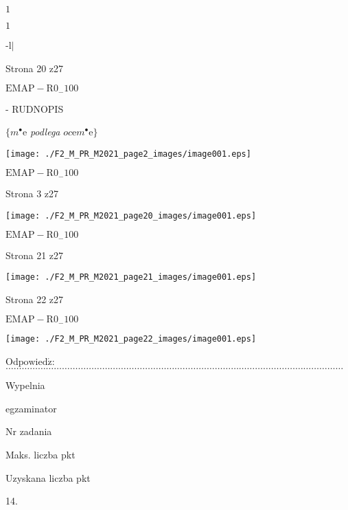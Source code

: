 \documentclass[a4paper,12pt]{article}
\begin{document}
$1$

$1$

-l$|$

Strona 20 z27

$\mathrm{E}\mathrm{M}\mathrm{A}\mathrm{P}-\mathrm{R}0_{-}100$





- RUDNOPIS

$\{m^{\bullet}\mathrm{e}$ {\it podlega} $oc\mathrm{e}m^{\bullet}\mathrm{e}\}$
\begin{center}
\texttt{[image: ./F2\_M\_PR\_M2021\_page2\_images/image001.eps]}
\end{center}
$\mathrm{E}\mathrm{M}\mathrm{A}\mathrm{P}-\mathrm{R}0_{-}100$

Strona 3 z27




\begin{center}
\texttt{[image: ./F2\_M\_PR\_M2021\_page20\_images/image001.eps]}
\end{center}
$\mathrm{E}\mathrm{M}\mathrm{A}\mathrm{P}-\mathrm{R}0_{-}100$

Strona 21 z27




\begin{center}
\texttt{[image: ./F2\_M\_PR\_M2021\_page21\_images/image001.eps]}
\end{center}
Strona 22 z27

$\mathrm{E}\mathrm{M}\mathrm{A}\mathrm{P}-\mathrm{R}0_{-}100$




\begin{center}
\texttt{[image: ./F2\_M\_PR\_M2021\_page22\_images/image001.eps]}
\end{center}
$\mathrm{O}\mathrm{d}\mathrm{p}\mathrm{o}\mathrm{w}\mathrm{i}\mathrm{e}\mathrm{d}\acute{\mathrm{z}}$:$\ldots\ldots\ldots\ldots\ldots\ldots\ldots\ldots\ldots\ldots\ldots\ldots\ldots\ldots\ldots\ldots\ldots\ldots\ldots\ldots\ldots\ldots\ldots\ldots\ldots\ldots\ldots\ldots\ldots\ldots\ldots\ldots\ldots\ldots\ldots\ldots\ldots\ldots\ldots\ldots\ldots\ldots$

Wypelnia

egzaminator

Nr zadania

Maks. liczba pkt

Uzyskana liczba pkt

14.
\end{document}
